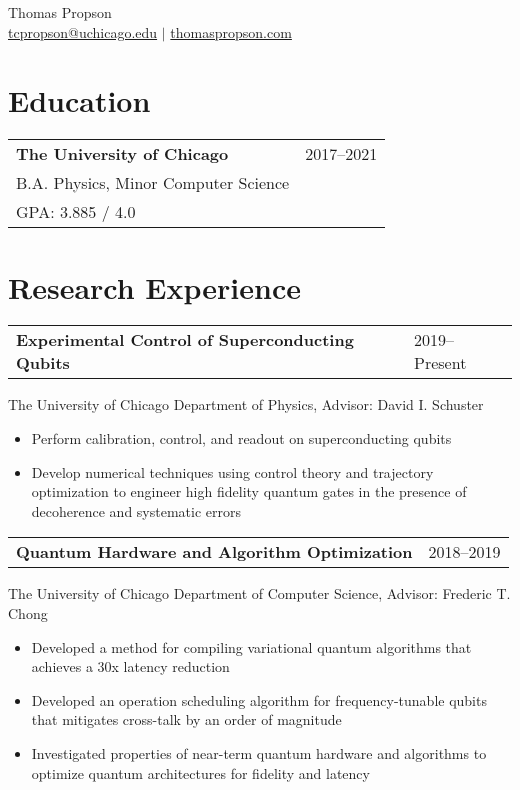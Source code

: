 \documentclass[letterpaper, 11pt]{article}
\begin{document}
\begin{center}
{\large Thomas Propson} \\[5pt]
\href{mailto:tcpropson@uchicago.edu}{tcpropson@uchicago.edu} $\vert$
\href{https://thomaspropson.com}{thomaspropson.com}
\end{center}


\flushleft

\section{Education}
\begin{tabular}{@{} L{12cm} @{} R{4.51cm} @{}}
  \textbf{The University of Chicago} & 2017--2021\\
  B.A. Physics, Minor Computer Science &\\
  GPA: 3.885 / 4.0 &\\
\end{tabular}

\section{Research Experience}
\begin{tabular}{@{} L{12cm} @{} R{4.51cm} @{}}
  \textbf{Experimental Control of Superconducting Qubits} & 2019--Present\\
\end{tabular}
The University of Chicago Department of Physics, Advisor: David I. Schuster\\
\begin{itemize}
  \item Perform calibration, control, and readout on superconducting qubits
  \item Develop numerical techniques using control theory and trajectory optimization
    to engineer high fidelity quantum gates in the presence of decoherence and systematic errors
\end{itemize}

\begin{tabular}{@{} L{12cm} @{} R{4.51cm} @{}}
  \textbf{Quantum Hardware and Algorithm Optimization} & 2018--2019\\
\end{tabular}
The University of Chicago Department of Computer Science, Advisor: Frederic T. Chong
\begin{itemize}
\item Developed a method for compiling variational quantum algorithms
  that achieves a 30x latency reduction
\item Developed an operation scheduling algorithm for
  frequency-tunable qubits that mitigates cross-talk by an order of magnitude
\item Investigated properties of near-term quantum hardware and algorithms
  to optimize quantum architectures for fidelity and latency
\end{itemize}
\end{document}

